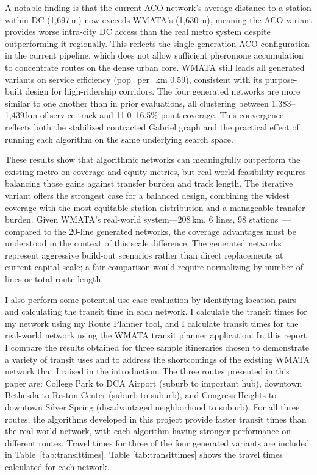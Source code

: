 \documentclass[sigconf,nonacm]{acmart}
\begin{document}
A notable finding is that the current ACO network's average distance to a station within DC (1,697\,m) now exceeds WMATA's (1,630\,m), meaning the ACO variant provides worse intra-city DC access than the real metro system despite outperforming it regionally. This reflects the single-generation ACO configuration in the current pipeline, which does not allow sufficient pheromone accumulation to concentrate routes on the dense urban core. WMATA still leads all generated variants on service efficiency (pop\_per\_km 0.59), consistent with its purpose-built design for high-ridership corridors. The four generated networks are more similar to one another than in prior evaluations, all clustering between 1,383--1,439\,km of service track and 11.0--16.5\% point coverage. This convergence reflects both the stabilized contracted Gabriel graph and the practical effect of running each algorithm on the same underlying search space.

These results show that algorithmic networks can meaningfully outperform the existing metro on coverage and equity metrics, but real-world feasibility requires balancing those gains against transfer burden and track length. The iterative variant offers the strongest case for a balanced design, combining the widest coverage with the most equitable station distribution and a manageable transfer burden. Given WMATA's real-world system---208\,km, 6 lines, 98 stations~\cite{lit:wmata_wikipedia}---compared to the 20-line generated networks, the coverage advantages must be understood in the context of this scale difference. The generated networks represent aggressive build-out scenarios rather than direct replacements at current capital scale; a fair comparison would require normalizing by number of lines or total route length.

I also perform some potential use-case evaluation by identifying location pairs and calculating the transit time in each network. I calculate the transit times for my network using my Route Planner tool, and I calculate transit times for the real-world network using the WMATA transit planner application. In this report I compare the results obtained for three sample itineraries chosen to demonstrate a variety of transit uses and to address the shortcomings of the existing WMATA network that I raised in the introduction. The three routes presented in this paper are: College Park to DCA Airport (suburb to important hub), downtown Bethesda to Reston Center (suburb to suburb), and Congress Heights to downtown Silver Spring (disadvantaged neighborhood to suburb). For all three routes, the algorithms developed in this project provide faster transit times than the real-world network, with each algorithm having stronger performance on different routes. Travel times for three of the four generated variants are included in Table~\ref{tab:transittimes}. Table \ref{tab:transittimes} shows the travel times calculated for each network. 
\end{document}
